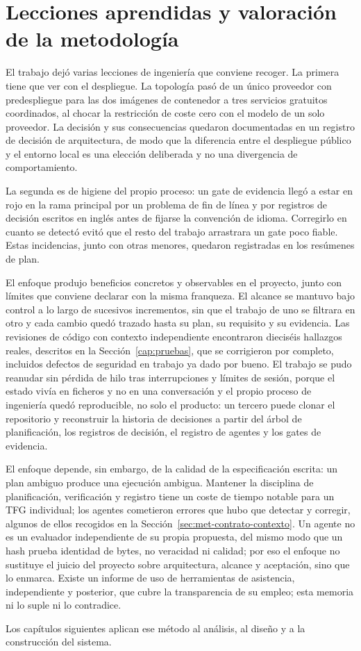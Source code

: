 \section{Lecciones aprendidas y valoración de la metodología}\label{sec:met-desviaciones}\label{sec:met-encuadre}\label{sec:gestion-beneficios}\label{sec:gestion-limitaciones}

El trabajo dejó varias lecciones de ingeniería que conviene recoger. La primera tiene que ver
con el despliegue. La topología pasó de un único proveedor con
predespliegue para las dos imágenes de contenedor a tres servicios gratuitos coordinados, al
chocar la restricción de coste cero con el modelo de un solo proveedor. La decisión y sus
consecuencias quedaron documentadas en un registro de decisión de arquitectura, de modo que
la diferencia entre el despliegue público y el entorno local es una elección deliberada y
no una divergencia de comportamiento.

La segunda es de higiene del propio proceso: un gate de evidencia llegó a estar en rojo en la
rama principal por un problema de fin de línea y por registros de decisión escritos en inglés
antes de fijarse la convención de idioma. Corregirlo en cuanto se detectó evitó que el resto
del trabajo arrastrara un gate poco fiable. Estas incidencias, junto con otras menores,
quedaron registradas en los resúmenes de plan.

El enfoque produjo beneficios concretos y observables en el proyecto, junto con límites que
conviene declarar con la misma franqueza. El alcance se mantuvo bajo control a lo largo de
sucesivos incrementos, sin que el trabajo de uno se filtrara en otro y cada cambio quedó
trazado hasta su plan, su requisito y su evidencia. Las revisiones de código con contexto
independiente encontraron dieciséis hallazgos reales, descritos en la
Sección~\ref{cap:pruebas}, que se corrigieron por completo, incluidos defectos de seguridad en
trabajo ya dado por bueno. El trabajo se pudo reanudar sin pérdida de hilo tras interrupciones
y límites de sesión, porque el estado vivía en ficheros y no en una conversación y el propio
proceso de ingeniería quedó reproducible, no solo el producto: un tercero puede clonar el
repositorio y reconstruir la historia de decisiones a partir del árbol de planificación, los
registros de decisión, el registro de agentes y los gates de evidencia.

El enfoque depende, sin embargo, de la calidad de la especificación escrita: un plan ambiguo
produce una ejecución ambigua. Mantener la disciplina de planificación, verificación y registro
tiene un coste de tiempo notable para un TFG individual; los agentes cometieron errores que
hubo que detectar y corregir, algunos de ellos recogidos en la
Sección~\ref{sec:met-contrato-contexto}. Un agente no es un evaluador independiente de su
propia propuesta, del mismo modo que un hash prueba identidad de bytes, no veracidad ni calidad;
por eso el enfoque no sustituye el juicio del proyecto sobre arquitectura, alcance y aceptación,
sino que lo enmarca. Existe un informe de uso de herramientas de asistencia, independiente y
posterior, que cubre la transparencia de su empleo; esta memoria ni lo suple ni lo contradice.

Los capítulos siguientes aplican ese método al análisis, al diseño y a la construcción del sistema.

